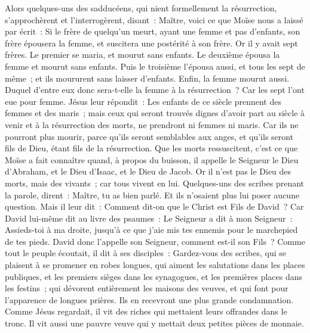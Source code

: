 \begin{multicols}{2}
Alors quelques-uns des sadducéens, qui nient formellement la résurrection, s'approchèrent et l'interrogèrent,
disant~: Maître, voici ce que Moïse nous a laissé par écrit~: Si le frère de quelqu'un meurt, ayant une femme et pas d'enfants, son frère épousera la femme, et suscitera une postérité à son frère.
Or il y avait sept frères. Le premier se maria, et mourut sans enfants.
Le deuxième épousa la femme et mourut sans enfants.
Puis le troisième l'épousa aussi, et tous les sept de même~; et ils moururent sans laisser d'enfants.
Enfin, la femme mourut aussi.
Duquel d'entre eux donc sera-t-elle la femme à la résurrection~? Car les sept l'ont eue pour femme.
Jésus leur répondit~: Les enfants de ce siècle prennent des femmes et des maris~;
mais ceux qui seront trouvés dignes d'avoir part au siècle à venir et à la résurrection des morts, ne prendront ni femmes ni maris.
Car ils ne pourront plus mourir, parce qu'ils seront semblables aux anges, et qu'ils seront fils de Dieu, étant fils de la résurrection.
Que les morts ressuscitent, c'est ce que Moïse a fait connaître quand, à propos du buisson, il appelle le Seigneur le Dieu d'Abraham, et le Dieu d'Isaac, et le Dieu de Jacob.
Or il n'est pas le Dieu des morts, mais des vivants~; car tous vivent en lui.
Quelques-uns des scribes prenant la parole, dirent~: Maître, tu as bien parlé.
Et ils n'osaient plus lui poser aucune question.
Mais il leur dit~: Comment dit-on que le Christ est Fils de David~?
Car David lui-même dit au livre des psaumes~: Le Seigneur a dit à mon Seigneur~: Assieds-toi à ma droite,
jusqu'à ce que j'aie mis tes ennemis pour le marchepied de tes pieds.
David donc l'appelle son Seigneur, comment est-il son Fils~?
Comme tout le peuple écoutait, il dit à ses disciples~:
Gardez-vous des scribes, qui se plaisent à se promener en robes longues, qui aiment les salutations dans les places publiques, et les premiers sièges dans les synagogues, et les premières places dans les festins~;
qui dévorent entièrement les maisons des veuves, et qui font pour l'apparence de longues prières. Ils en recevront une plus grande condamnation.
\VerseOne{}Comme Jésus regardait, il vit des riches qui mettaient leurs offrandes dans le tronc.
Il vit aussi une pauvre veuve qui y mettait deux petites pièces de monnaie.

\end{multicols}
